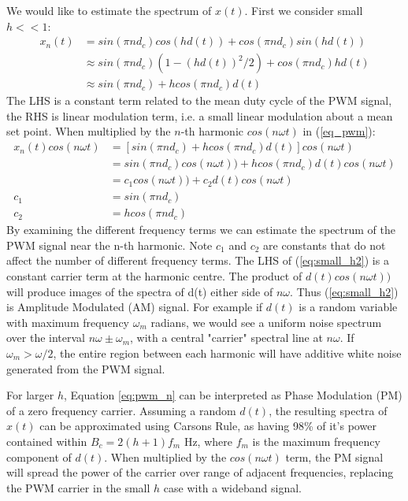 \documentclass{article}
\begin{document}
We would like to estimate the spectrum of $x(t)$. First we consider small $h << 1$:
\begin{equation} \label{eq:small_h}
\begin{split}
x_n(t) &= sin(\pi n d_c)cos(hd(t)) + cos(\pi n d_c)sin(hd(t)) \\
       &\approx sin(\pi n d_c)(1 - (hd(t))^2/2) + cos(\pi n d_c)hd(t) \\
       &\approx sin(\pi n d_c) + hcos(\pi n d_c)d(t)
\end{split}
\end{equation}
The LHS is a constant term related to the mean duty cycle of the PWM signal, the RHS is linear modulation term, i.e. a small linear modulation about a mean set point.  When multiplied by the $n$-th harmonic $cos(n \omega t)$ in (\ref{eq_pwm}):
\begin{equation}
\begin{split} \label{eq:small_h2}
x_n(t)cos(n \omega t) &= \left[ sin(\pi n d_c) + hcos(\pi n d_c)d(t) \right] cos(n \omega t) \\
                      &= sin(\pi n d_c)cos(n \omega t)) + hcos(\pi n d_c)d(t)cos(n \omega t) \\
                      &= c_1 cos(n \omega t)) + c_2 d(t)cos(n \omega t) \\
                   c_1 &= sin(\pi n d_c) \\
                   c_2 &= hcos(\pi n d_c)
\end{split}
\end{equation}
By examining the different frequency terms we can estimate the spectrum of the PWM signal near the n-th harmonic. Note $c_1$ and $c_2$ are constants that do not affect the number of different frequency terms. The LHS of (\ref{eq:small_h2}) is a constant carrier term at the harmonic centre. The product of $d(t)cos(n \omega t))$ will produce images of the spectra of d(t) either side of $n \omega$. Thus (\ref{eq:small_h2}) is Amplitude Modulated (AM) signal.  For example if $d(t)$ is a random variable with maximum frequency $\omega_m$ radians, we would see a uniform noise spectrum over the interval $n \omega \pm \omega_m$, with a central "carrier" spectral line at $n \omega$. If $\omega_m > \omega/2$, the entire region between each harmonic will have additive white noise generated from the PWM signal.

For larger $h$, Equation \ref{eq:pwm_n} can be interpreted as Phase Modulation (PM) \cite{wikipedia_phase} of a zero frequency carrier. Assuming a random $d(t)$, the resulting spectra of $x(t)$ can be approximated using Carsons Rule, as having 98\% of it's power contained within $B_c=2(h+1)f_m$ Hz, where $f_m$ is the maximum frequency component of $d(t)$. When multiplied by the $cos(n \omega t)$ term, the PM signal will spread the power of the carrier over range of adjacent frequencies, replacing the PWM carrier in the small $h$ case with a wideband signal.
\end{document}
